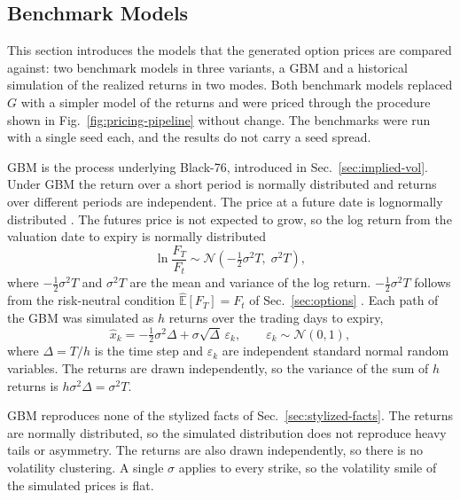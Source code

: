 \subsection{Benchmark Models}\label{sec:benchmarks}
This section introduces the models that the generated option prices are compared against: two benchmark models in three variants, a GBM and a historical simulation of the realized returns in two modes. Both benchmark models replaced $G$ with a simpler model of the returns and were priced through the procedure shown in Fig.~\ref{fig:pricing-pipeline} without change. The benchmarks were run with a single seed each, and the results do not carry a seed spread.

GBM is the process underlying Black-76, introduced in Sec.~\ref{sec:implied-vol}. Under GBM the return over a short period is normally distributed and returns over different periods are independent. The price at a future date is lognormally distributed \parencite[332]{hullOptionsFuturesOther2022}. The futures price is not expected to grow, so the log return from the valuation date to expiry is normally distributed
\begin{equation}
    \ln \frac{F_T}{F_t} \sim
    \mathcal{N}\!\left(-\tfrac{1}{2}\sigma^{2}T, \; \sigma^{2}T\right),
    \label{eq:gbm-horizon}
\end{equation}
where $-\frac{1}{2}\sigma^2 T$ and $\sigma^2 T$ are the mean and variance of the log return. $-\frac{1}{2}\sigma^2 T$ follows from the risk-neutral condition $\hat{\mathbb{E}}[F_T] = F_t$ of Sec.~\ref{sec:options} \parencite[328]{hullOptionsFuturesOther2022}. Each path of the GBM was simulated as $h$ returns over the trading days to expiry, 
\begin{equation}
    \hat{x}_k = -\tfrac{1}{2}\sigma^{2}\Delta
          + \sigma\sqrt{\Delta}\,\varepsilon_k,
    \qquad
    \varepsilon_k \sim \mathcal{N}(0,1),
    \label{eq:gbm-discrete}
\end{equation}
where $\Delta = T / h$ is the time step and $\varepsilon_k$ are independent standard normal random variables. The returns are drawn independently, so the variance of the sum of $h$ returns is $h \sigma^2 \Delta = \sigma^2 T$.

GBM reproduces none of the stylized facts of Sec.~\ref{sec:stylized-facts}. The returns are normally distributed, so the simulated distribution does not reproduce heavy tails or asymmetry. The returns are also drawn independently, so there is no volatility clustering. A single $\sigma$ applies to every strike, so the volatility smile of the simulated prices is flat.

